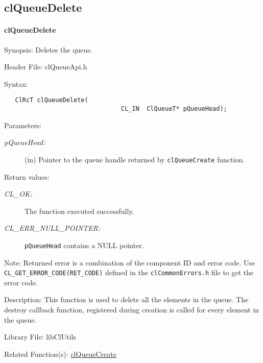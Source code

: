 \begin{flushleft}
\subsection{clQueueDelete}
\hypertarget{pageq106}{}\paragraph{cl\-Queue\-Delete}\label{pageq106}
\begin{Desc}
\item[Synopsis:]Deletes the queue.\end{Desc}
\begin{Desc}
\item[Header File:]clQueueApi.h\end{Desc}
\begin{Desc}
\item[Syntax:]

\footnotesize\begin{verbatim}   ClRcT clQueueDelete(
                       			CL_IN  ClQueueT* pQueueHead);
\end{verbatim}
\normalsize
\end{Desc}
\begin{Desc}
\item[Parameters:]
\begin{description}
\item[{\em p\-Queue\-Head:}](in) Pointer to the queue handle returned by {\tt{cl\-Queue\-Create}} function.\end{description}
\end{Desc}
\begin{Desc}
\item[Return values:]
\begin{description}
\item[{\em CL\_\-OK:}]The function executed successfully. 
\item[{\em CL\_\-ERR\_\-NULL\_\-POINTER:}]{\tt{pQueueHead}} contains a NULL pointer. 
\end{description}
\end{Desc}
\begin{Desc}
\item[Note:]Returned error is a combination of the component ID and error code. Use {\tt {CL\_\-GET\_\-ERROR\_\-CODE(RET\_\-CODE)}} defined in the
{\tt{clCommonErrors.h}} file to get the error code.\end{Desc}
\begin{Desc}
\item[Description:]This function is used to delete all the elements in the queue. The destroy callback function, registered during creation is called for 
every element in the queue.\end{Desc}
\begin{Desc}
\item[Library File:]lib\-Cl\-Utils\end{Desc}
\begin{Desc}
\item[Related Function(s):]\hyperlink{pageq101}{cl\-Queue\-Create} \end{Desc}


\end{flushleft}
